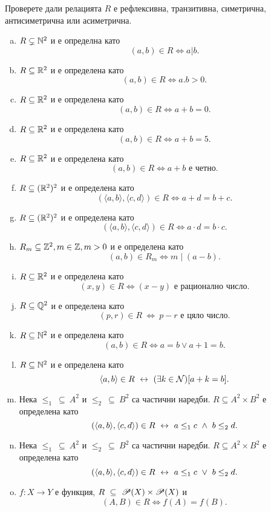 \begin{problem}
  Проверете дали релацията $R$ е рефлексивна, транзитивна, симетрична, антисиметрична или асиметрична.
  \begin{enumerate}[a)]
  \item
    $R\subsetneq \mathbb{N}^2$ и е определна като 
    \[(a,b) \in R \iff a | b.\]
  \item
    $R\subseteq \mathbb{R}^2$ и е определена като
    \[(a,b) \in R \iff a.b > 0.\]
  \item
    $R\subseteq \mathbb{R}^2$ и е определена като 
    \[(a,b) \in R \iff a+b = 0.\]
  \item
    $R\subseteq \mathbb{R}^2$ и е определена като
    \[(a,b) \in R \iff a+b = 5.\]
  \item
    $R\subseteq \mathbb{R}^2$ и е определена като 
    \[(a,b) \in R \iff a+b\mbox{ е четно}.\]
  \item
    $R\subseteq (\mathbb{R}^2)^2$ и е определена като
    \[(\langle{a,b}\rangle, \langle{c,d}\rangle) \in R \iff a+d = b+c.\]
  \item
    $R\subseteq (\mathbb{R}^2)^2$ и е определена като
    \[(\langle{a,b}\rangle,\langle{c,d}\rangle) \in R \iff a\cdot d = b\cdot c.\]
  \item
    $R_{m}\subseteq \mathbb{Z}^2, m\in \mathbb{Z}, m>0$ и е определена като
    \[(a,b) \in R_m \iff m\mid (a - b).\]
  \item
    $R\subseteq \mathbb{R}^2$ и е определена като 
    \[(x,y) \in R \iff (x-y)\mbox{ е рационално число}.\]
  \item
    $R \subseteq \mathbb{Q}^2$ и е определена като
    \[(p,r) \in R\ \iff\ p-r \mbox{ е цяло число}.\]
  \item
    $R \subseteq \mathbb{N}^2$ и е определена като
    \[(a,b) \in R \iff a = b \vee a+1 = b.\]
  \item
    $R \subseteq \mathbb{N}^2$ и е определена като
    \[\langle{a,b}\rangle\in R \ \leftrightarrow\  (\exists k\in\mathcal{N})[a+k = b].\]
  \item
    Нека $\leq_1\ \subseteq\ A^2$ и $\leq_2\ \subseteq\ B^2$ са частични наредби.
    $R \subseteq A^2\times B^2$ е определена като
    \[(\langle{a,b}\rangle, \langle{c,d}\rangle) \in R \ \leftrightarrow\  a\leq_{1}c\ \wedge\ b\leq_{2}d .\]
  \item
    Нека $\leq_1\ \subseteq\ A^2$ и $\leq_2\ \subseteq\ B^2$ са частични наредби.
    $R \subseteq A^2\times B^2$ е определена като
    \[(\langle{a,b}\rangle, \langle{c,d}\rangle) \in R \ \leftrightarrow\  a\leq_{1}c\ \vee\ b\leq_{2}d .\]
  \item
    $f:X\rightarrow Y$ е функция, $R\ \subseteq\ \Ps(X)\times\Ps(X)$ и 
    \[(A,B)\in R \iff f(A) = f(B).\]
  \end{enumerate}
\end{problem}

